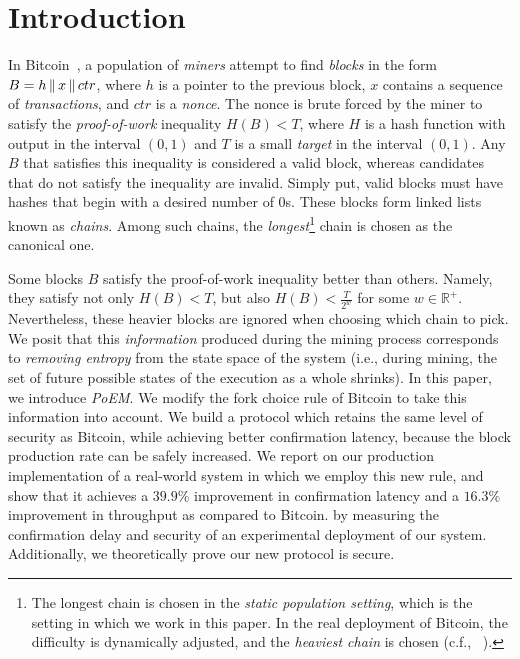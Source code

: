 \section{Introduction}

In Bitcoin~\cite{bitcoin}, a population of \emph{miners}
attempt to find \emph{blocks} in the form $B = h \,\|\, x \,\|\, ctr$,
where $h$ is a pointer to the previous block, $x$ contains a sequence of
\emph{transactions}, and $ctr$ is a \emph{nonce}. The nonce is brute forced
by the miner to satisfy the \emph{proof-of-work} inequality $H(B) < T$, where
$H$ is a hash function with output in the interval $(0, 1)$
and $T$ is a small \emph{target} in the interval $(0, 1)$. Any $B$ that satisfies this
inequality is considered a valid block, whereas candidates that do not satisfy
the inequality are invalid. Simply put, valid blocks must have
hashes that begin with a desired number of $0$s.
These blocks form linked lists known as \emph{chains}.
Among such chains, the \emph{longest}\footnote{The
longest chain is chosen in the \emph{static population setting}, which is the
setting in which we work in this paper. In the real deployment of Bitcoin, the
difficulty is dynamically adjusted, and the \emph{heaviest chain} is chosen (c.f.,
~\cite{varbackbone}).} chain is chosen as the canonical one.

Some blocks $B$ satisfy the proof-of-work inequality better than others.
Namely, they satisfy not only $H(B) < T$, but also $H(B) < \frac{T}{2^w}$
for some $w \in \mathbb{R}^+$. Nevertheless, these heavier blocks are ignored when choosing
which chain to pick. We posit that this \emph{information}
produced during the mining process corresponds to \emph{removing entropy} from the
state space of the system (i.e., during mining, the set of future possible states
of the execution as a whole shrinks).
In this paper, we introduce \emph{PoEM}.
We modify the fork choice rule of Bitcoin to take this information into account.
We build a protocol which retains the same level of security as Bitcoin, while achieving
better confirmation latency, because the block production rate can be safely increased.
We report on our production implementation of a real-world system
in which we employ this new rule, and show that it achieves a $39.9\%$
improvement in confirmation latency
and a $16.3\%$ improvement in throughput as compared to Bitcoin.
by measuring the confirmation delay and security
of an experimental deployment of our system.
Additionally, we theoretically prove our new protocol is secure.

